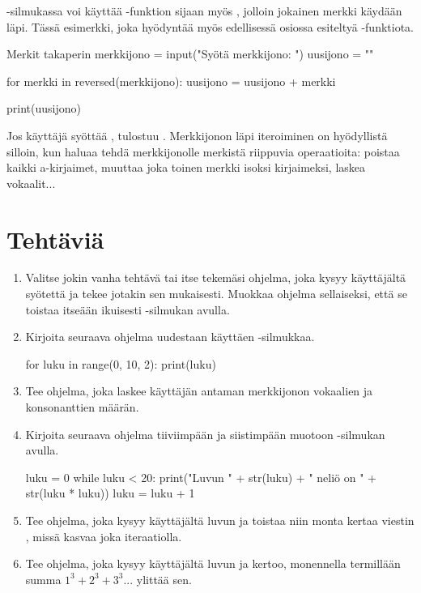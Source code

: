 -silmukassa voi käyttää -funktion sijaan myös , jolloin jokainen merkki käydään läpi. Tässä esimerkki, joka hyödyntää myös edellisessä osiossa esiteltyä -funktiota.

\begin{example}{Merkit takaperin}
merkkijono = input("Syötä merkkijono: ")
uusijono = ""

for merkki in reversed(merkkijono):
	uusijono = uusijono + merkki

print(uusijono)
\end{example}

Jos käyttäjä syöttää , tulostuu . Merkkijonon läpi iteroiminen on hyödyllistä silloin, kun haluaa tehdä merkkijonolle merkistä riippuvia operaatioita: poistaa kaikki a-kirjaimet, muuttaa joka toinen merkki isoksi kirjaimeksi, laskea vokaalit...

\section{Tehtäviä}

\begin{enumerate}[\thesection .1]

\item Valitse jokin vanha tehtävä tai itse tekemäsi ohjelma, joka kysyy käyttäjältä syötettä ja tekee jotakin sen mukaisesti. Muokkaa ohjelma sellaiseksi, että se toistaa itseään ikuisesti -silmukan avulla.

\item Kirjoita seuraava ohjelma uudestaan käyttäen -silmukkaa.

\begin{python}
for luku in range(0, 10, 2):
	print(luku)
\end{python}

\item Tee ohjelma, joka laskee käyttäjän antaman merkkijonon vokaalien ja konsonanttien määrän.

\item Kirjoita seuraava ohjelma tiiviimpään ja siistimpään muotoon -silmukan avulla.

\begin{python}
luku = 0
while luku < 20:
	print("Luvun " + str(luku) + " neliö on " + str(luku * luku))
	luku = luku + 1 
\end{python}

\item Tee ohjelma, joka kysyy käyttäjältä luvun ja toistaa niin monta kertaa viestin , missä  kasvaa joka iteraatiolla.

\item Tee ohjelma, joka kysyy käyttäjältä luvun ja kertoo, monennella termillään summa $1^3 + 2^3 + 3^3 ...$ ylittää sen.

\end{enumerate}
